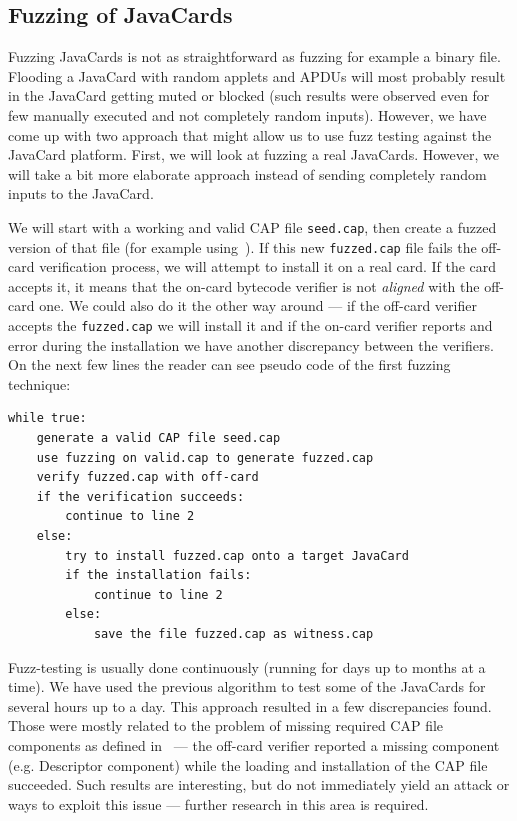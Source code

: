 \documentclass{../llncs/llncs}
\begin{document}
    \subsection{Fuzzing of JavaCards}
    Fuzzing JavaCards is not as straightforward as fuzzing for example a binary file. Flooding a JavaCard with random applets and APDUs will most probably result in the JavaCard getting muted or blocked (such results were observed even for few manually executed and not completely random inputs). However, we have come up with two approach that might allow us to use fuzz testing against the JavaCard platform. First, we will look at fuzzing a real JavaCards. However, we will take a bit more elaborate approach instead of sending completely random inputs to the JavaCard.

    We will start with a working and valid CAP file \texttt{seed.cap}, then create a fuzzed version of that file (for example using~\cite{radamsa}). If this new \texttt{fuzzed.cap} file fails the off-card verification process, we will attempt to install it on a real card. If the card accepts it, it means that the on-card bytecode verifier is not \textit{aligned} with the off-card one. We could also do it the other way around --- if the off-card verifier accepts the \texttt{fuzzed.cap} we will install it and if the on-card verifier reports and error during the installation we have another discrepancy between the verifiers. On the next few lines the reader can see pseudo code of the first fuzzing technique:


\begin{verbatim}
while true:
    generate a valid CAP file seed.cap
    use fuzzing on valid.cap to generate fuzzed.cap
    verify fuzzed.cap with off-card
    if the verification succeeds:
        continue to line 2
    else:
        try to install fuzzed.cap onto a target JavaCard
        if the installation fails:
            continue to line 2
        else: 
            save the file fuzzed.cap as witness.cap
\end{verbatim}

Fuzz-testing is usually done continuously (running for days up to months at a time). We have used the previous algorithm to test some of the JavaCards for several hours up to a day. This approach resulted in a few discrepancies found. Those were mostly related to the problem of missing required CAP file components as defined in~\cite{jcspecs31download} --- the off-card verifier reported a missing component (e.g. Descriptor component) while the loading and installation of the CAP file succeeded. Such results are interesting, but do not immediately yield an attack or ways to exploit this issue --- further research in this area is required.
\end{document}
